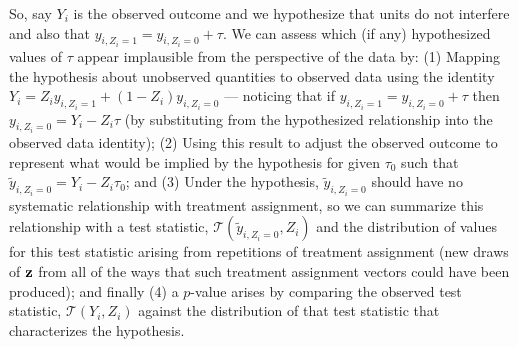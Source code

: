 So, say $Y_i$ is the observed outcome and we hypothesize that units do not
interfere and also that $y_{i,Z_i=1}=y_{i,Z_i=0}+\tau$. We can
assess which (if any) hypothesized values of $\tau$ appear implausible from
the perspective of the data by: (1) Mapping the hypothesis about unobserved
quantities to observed data using the identity $Y_i=Z_i y_{i,Z_i=1} + (1-Z_i) y_{i,Z_i=0}$ ---
noticing that if $y_{i,Z_i=1}=y_{i,Z_i=0}+\tau$ then $y_{i,Z_i=0}=Y_i - Z_i
\tau$ (by substituting from the hypothesized relationship into the observed
data identity); (2) Using this result to adjust the observed outcome to
represent what would be implied by the hypothesis for given $\tau_0$ such that
$\widetilde y_{i,Z_i=0}=Y_i - Z_i \tau_0$; and (3) Under the hypothesis,
$\widetilde y_{i,Z_i=0}$ should have no systematic relationship with treatment
assignment, so we can summarize this relationship with a test statistic,
$\mathcal T(\widetilde y_{i,Z_i=0},Z_i)$ and the distribution of values for
this test statistic arising from repetitions of treatment assignment (new
draws of $\mathbf{z}$ from all of the ways that such treatment assignment vectors
could have been produced); and finally (4) a $p$-value arises by comparing the
observed test statistic, $\mathcal T(Y_i,Z_i)$ against the distribution of that test
statistic that characterizes the hypothesis.

